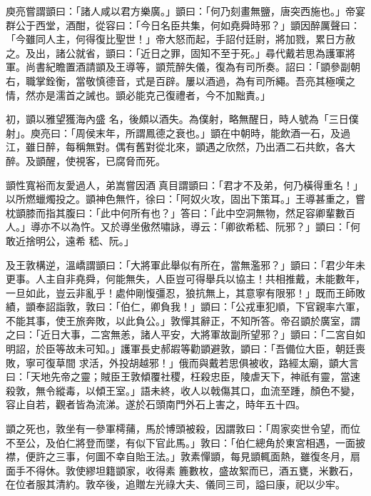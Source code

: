 \begin{pinyinscope}
 庾亮嘗謂顗曰：「諸人咸以君方樂廣。」顗曰：「何乃刻畫無鹽，唐突西施也。」帝宴群公于西堂，酒酣，從容曰：「今日名臣共集，何如堯舜時邪？」顗因醉厲聲曰：「今雖同人主，何得復比聖世！」帝大怒而起，手詔付廷尉，將加戮，累日方赦之。及出，諸公就省，顗曰：「近日之罪，固知不至于死。」尋代戴若思為護軍將軍。尚書紀瞻置酒請顗及王導等，顗荒醉失儀，復為有司所奏。詔曰：「顗參副朝右，職掌銓衡，當敬慎德音，式是百辟。屢以酒過，為有司所繩。吾亮其極嘆之情，然亦是濡首之誡也。顗必能克己復禮者，今不加黜責。」



 初，顗以雅望獲海內盛
 名，後頗以酒失。為僕射，略無醒日，時人號為「三日僕射」。庾亮曰：「周侯末年，所謂鳳德之衰也。」顗在中朝時，能飲酒一石，及過江，雖日醉，每稱無對。偶有舊對從北來，顗遇之欣然，乃出酒二石共飲，各大醉。及顗醒，使視客，已腐脅而死。



 顗性寬裕而友愛過人，弟嵩嘗因酒真目謂顗曰：「君才不及弟，何乃橫得重名！」以所燃蠟燭投之。顗神色無忤，徐曰：「阿奴火攻，固出下策耳。」王導甚重之，嘗枕顗膝而指其腹曰：「此中何所有也？」答曰：「此中空洞無物，然足容卿輩數百人。」導亦不以為忤。又於導坐傲然嘯詠，導云：「卿欲希嵇、阮邪？」顗曰：「何敢近捨明公，遠希
 嵇、阮。」



 及王敦構逆，溫嶠謂顗曰：「大將軍此舉似有所在，當無濫邪？」顗曰：「君少年未更事。人主自非堯舜，何能無失，人臣豈可得舉兵以協主！共相推戴，未能數年，一旦如此，豈云非亂乎！處仲剛愎彊忍，狼抗無上，其意寧有限邪！」既而王師敗績，顗奉詔詣敦，敦曰：「伯仁，卿負我！」顗曰：「公戎車犯順，下官親率六軍，不能其事，使王旅奔敗，以此負公。」敦憚其辭正，不知所答。帝召顗於廣室，謂之曰：「近日大事，二宮無恙，諸人平安，大將軍故副所望邪？」顗曰：「二宮自如明詔，於臣等故未可知。」護軍長史郝嘏等勸顗避敦，顗曰：「吾備位大臣，朝廷喪敗，寧可復草間
 求活，外投胡越邪！」俄而與戴若思俱被收，路經太廟，顗大言曰：「天地先帝之靈；賊臣王敦傾覆社稷，枉殺忠臣，陵虐天下，神祇有靈，當速殺敦，無令縱毒，以傾王室。」語未終，收人以戟傷其口，血流至踵，顏色不變，容止自若，觀者皆為流涕。遂於石頭南門外石上害之，時年五十四。



 顗之死也，敦坐有一參軍樗蒱，馬於博頭被殺，因謂敦曰：「周家奕世令望，而位不至公，及伯仁將登而墜，有似下官此馬。」敦曰：「伯仁總角於東宮相遇，一面披襟，便許之三事，何圖不幸自貽王法。」敦素憚顗，每見顗輒面熱，雖復冬月，扇面手不得休。敦使繆坦籍顗家，收得素
 簏數枚，盛故絮而已，酒五甕，米數石，在位者服其清約。敦卒後，追贈左光祿大夫、儀同三司，謚曰康，祀以少牢。




\end{pinyinscope}
